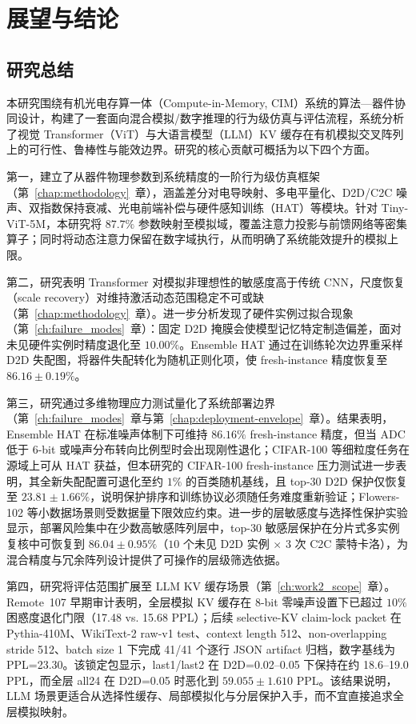 \chapter{展望与结论}
\label{ch:outlook}

\section{研究总结}

本研究围绕有机光电存算一体（Compute-in-Memory, CIM）系统的算法—器件协同设计，构建了一套面向混合模拟/数字推理的行为级仿真与评估流程，系统分析了视觉 Transformer（ViT）与大语言模型（LLM）KV 缓存在有机模拟交叉阵列上的可行性、鲁棒性与能效边界。研究的核心贡献可概括为以下四个方面。

第一，建立了从器件物理参数到系统精度的一阶行为级仿真框架（第~\ref{chap:methodology}~章），涵盖差分对电导映射、多电平量化、D2D/C2C 噪声、双指数保持衰减、光电前端补偿与硬件感知训练（HAT）等模块。针对 Tiny-ViT-5M，本研究将 $87.7\%$ 参数映射至模拟域，覆盖注意力投影与前馈网络等密集算子；同时将动态注意力保留在数字域执行，从而明确了系统能效提升的模拟上限。

第二，研究表明 Transformer 对模拟非理想性的敏感度高于传统 CNN，尺度恢复（scale recovery）对维持激活动态范围稳定不可或缺（第~\ref{chap:methodology}~章）。进一步分析发现了硬件实例过拟合现象（第~\ref{ch:failure_modes}~章）：固定 D2D 掩膜会使模型记忆特定制造偏差，面对未见硬件实例时精度退化至 $10.00\%$。Ensemble HAT 通过在训练轮次边界重采样 D2D 失配图，将器件失配转化为随机正则化项，使 fresh-instance 精度恢复至 $86.16\pm0.19\%$。

第三，研究通过多维物理应力测试量化了系统部署边界（第~\ref{ch:failure_modes}~章与第~\ref{chap:deployment-envelope}~章）。结果表明，Ensemble HAT 在标准噪声体制下可维持 $86.16\%$ fresh-instance 精度，但当 ADC 低于 6-bit 或噪声分布转向比例型时会出现刚性退化；CIFAR-100 等细粒度任务在源域上可从 HAT 获益，但本研究的 CIFAR-100 fresh-instance 压力测试进一步表明，其全新失配配置可退化至约 $1\%$ 的百类随机基线，且 top-$30$ D2D 保护仅恢复至 $23.81\pm1.66\%$，说明保护排序和训练协议必须随任务难度重新验证；Flowers-102 等小数据场景则受数据量下限效应约束。进一步的层敏感度与选择性保护实验显示，部署风险集中在少数高敏感阵列层中，top-$30$ 敏感层保护在分片式多实例复核中可恢复到 $86.04\pm0.95\%$（$10$ 个未见 D2D 实例 $\times$ $3$ 次 C2C 蒙特卡洛），为混合精度与冗余阵列设计提供了可操作的层级筛选依据。

第四，研究将评估范围扩展至 LLM KV 缓存场景（第~\ref{ch:work2_scope}~章）。Remote~107 早期审计表明，全层模拟 KV 缓存在 8-bit 零噪声设置下已超过 $10\%$ 困惑度退化门限（17.48 vs. 15.68 PPL）；后续 selective-KV claim-lock packet 在 Pythia-410M、WikiText-2 raw-v1 test、context length 512、non-overlapping stride 512、batch size 1 下完成 41/41 个逐行 JSON artifact 归档，数字基线为 PPL=23.30。该锁定包显示，last1/last2 在 D2D=0.02--0.05 下保持在约 18.6--19.0 PPL，而全层 all24 在 D2D=0.05 时恶化到 $59.055\pm1.610$ PPL。该结果说明，LLM 场景更适合从选择性缓存、局部模拟化与分层保护入手，而不宜直接追求全层模拟映射。

